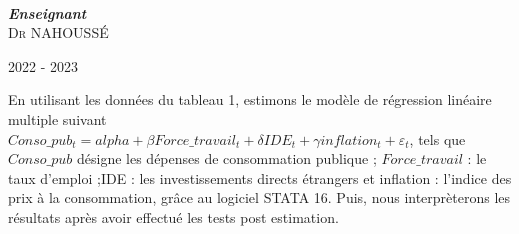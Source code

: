 \documentclass[a4paper, 12pt, openany]{book}
\begin{document}
\begin{titlepage}
\begin{minipage}{0.4\textwidth}
\begin{flushleft}
		\end{flushleft}
	\end{minipage}
	~
	\begin{minipage}{.4\textwidth}
		\begin{flushright}
			\small
			\textit{\textbf{Enseignant}}\\
			 \textsc{Dr NAHOUSSÉ} %
		\end{flushright}
	\end{minipage}
	
	
	
	\vfill\vfill\vfill %
	
	{\large 2022 - 2023} %
	
	
	 
	
	\vfill %
	
\end{titlepage}

\tableofcontents

\newpage
En utilisant les données du tableau 1,  estimons le modèle de régression linéaire multiple suivant 
$Conso\_pub_t=alpha+\beta Force\_travail_t+\delta IDE_t+\gamma inflation_t+\varepsilon_t$,  tels que $Conso\_pub$ désigne les dépenses de consommation publique ;  $Force\_travail$ : le taux d’emploi ;IDE : les investissements directs étrangers et inflation : l’indice des prix à la consommation, grâce au logiciel STATA 16. Puis, nous interprèterons les résultats après avoir effectué les tests post estimation.
\end{document}
